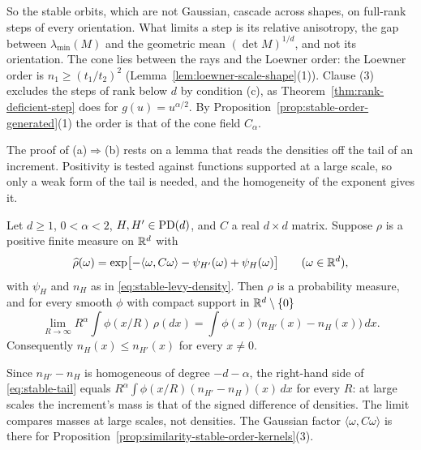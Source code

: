 So the stable orbits, which are not Gaussian, cascade across shapes, on full-rank steps of every
orientation. What
limits a step is its relative anisotropy, the gap between $\lambda_{\min}(M)$ and the geometric mean
$(\det M)^{1/d}$, and not its orientation. The cone lies between the rays and the Loewner order: the
Loewner order is $n_1 \ge (t_1/t_2)^2$ (Lemma~\ref{lem:loewner-scale-shape}(1)). Clause (3)
excludes the steps of rank below $d$ by condition (c), as Theorem~\ref{thm:rank-deficient-step} does for
$g(u) = u^{\alpha/2}$. By Proposition~\ref{prop:stable-order-generated}(1) the order is that of the
cone field $C_\alpha$.

The proof of (a)$\Rightarrow$(b) rests on a lemma that reads the \Levy{} densities off the tail of an
increment. Positivity is tested against functions supported at a large scale, so only a weak form of
the tail is needed, and the homogeneity of the exponent gives it.

\begin{lemma}\label{lem:stable-tail}
Let $d \ge 1$, $0 < \alpha < 2$, $H, H' \in \mathrm{PD}(d)$, and $C$ a real $d \times d$ matrix.
Suppose $\rho$ is a positive finite measure on $\mathbb{R}^d$ with
\begin{equation}\label{eq:stable-tail-transform}
  \widehat\rho(\omega) = \exp\bigl[-\langle\omega,C\omega\rangle - \psi_{H'}(\omega) + \psi_H(\omega)\bigr]
  \qquad (\omega \in \mathbb{R}^d),
\end{equation}
with $\psi_H$ and $n_H$ as in \ref{eq:stable-levy-density}. Then $\rho$ is a probability measure,
and for every smooth $\phi$ with compact support in $\mathbb{R}^d \setminus \{0\}$
\begin{equation}\label{eq:stable-tail}
  \lim_{R\to\infty} R^\alpha\int\phi(x/R)\,\rho(dx) = \int\phi(x)\,\bigl(n_{H'}(x) - n_H(x)\bigr)\,dx .
\end{equation}
Consequently $n_H(x) \le n_{H'}(x)$ for every $x \ne 0$.
\end{lemma}

Since $n_{H'} - n_H$ is homogeneous of degree $-d-\alpha$, the right-hand side of \ref{eq:stable-tail}
equals $R^\alpha\int\phi(x/R)(n_{H'} - n_H)(x)\,dx$ for every $R$: at large scales the increment's mass
is that of the signed difference of \Levy{} densities. The limit compares masses at large scales, not
densities. The Gaussian factor $\langle\omega,C\omega\rangle$ is there for
Proposition~\ref{prop:similarity-stable-order-kernels}(3).

